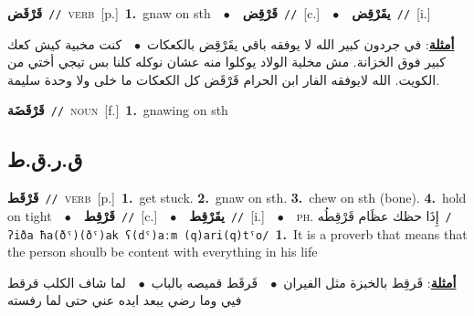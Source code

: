 \documentclass[10pt,a4paper,twoside]{article} %
\begin{document}
\begin{multicols}{2}
{\setlength\topsep{0pt}\textbf{\foreignlanguage{arabic}{قَرْقَض}}\ {\color{gray}\texttt{//}\color{black}}\ \textsc{verb}\ [p.]\ \textbf{1.}~gnaw on sth\ \ $\bullet$\ \ \setlength\topsep{0pt}\textbf{\foreignlanguage{arabic}{قَرْقِض}}\ {\color{gray}\texttt{//}\color{black}}\ [c.]\ \ $\bullet$\ \ \setlength\topsep{0pt}\textbf{\foreignlanguage{arabic}{يقَرْقِض}}\ {\color{gray}\texttt{//}\color{black}}\ [i.]\  \begin{flushright}\color{gray}\foreignlanguage{arabic}{\textbf{\underline{\foreignlanguage{arabic}{أمثلة}}}: في جردون كبير الله لا يوفقه باقي يقَرْقِض بالكعكات\ $\bullet$\ \  كنت مخبية كيش كعك كبير فوق الخزانة. مش مخلية الولاد يوكلوا منه عشان نوكله كلنا بس تيجي أختي من الكويت. الله لايوفقه الفار ابن الحرام قَرْقَض كل الكعكات ما خلى ولا وحدة سليمة.}\end{flushright}\color{black}} \vspace{2mm}

{\setlength\topsep{0pt}\textbf{\foreignlanguage{arabic}{قَرْقَضَة}}\ {\color{gray}\texttt{//}\color{black}}\ \textsc{noun}\ [f.]\ \textbf{1.}~gnawing on sth\ } \vspace{2mm}

\vspace{-3mm}
\subsection*{\color{blue}\foreignlanguage{arabic}{ق.ر.ق.ط}\color{blue}{}} 

{\setlength\topsep{0pt}\textbf{\foreignlanguage{arabic}{قَرْقَط}}\ {\color{gray}\texttt{//}\color{black}}\ \textsc{verb}\ [p.]\ \textbf{1.}~get stuck.  \textbf{2.}~gnaw on sth.  \textbf{3.}~chew on sth (bone).  \textbf{4.}~hold on tight\ \ $\bullet$\ \ \setlength\topsep{0pt}\textbf{\foreignlanguage{arabic}{قَرْقِط}}\ {\color{gray}\texttt{//}\color{black}}\ [c.]\ \ $\bullet$\ \ \setlength\topsep{0pt}\textbf{\foreignlanguage{arabic}{يقَرْقِط}}\ {\color{gray}\texttt{//}\color{black}}\ [i.]\ \ $\bullet$\ \ \textsc{ph.} \color{gray} \foreignlanguage{arabic}{إِذَا حظك عظَام قَرْقِطُه}\color{black}\ {\color{gray}\texttt{/{\sffamily ʔiða ħa(ðˤ)(ðˤ)ak ʕ(dˤ)aːm (q)ari(q)tˤo}/}\color{black}}\ \textbf{1.}~It is a proverb that means that the person shoulb be content with everything in his life\  \begin{flushright}\color{gray}\foreignlanguage{arabic}{\textbf{\underline{\foreignlanguage{arabic}{أمثلة}}}: قَرقِط بالخبزة مثل الفيران\ $\bullet$\ \  قَرقَط قميصه بالباب\ $\bullet$\ \  لما شاف الكلب قرقط فيي وما رضي يبعد ايده عني حتى لما رفسته}\end{flushright}\color{black}} \vspace{2mm}


\end{multicols}
\end{document}
